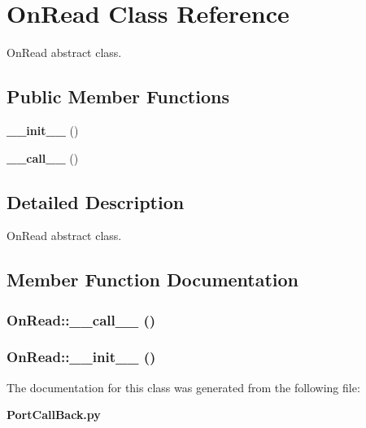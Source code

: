 \section{On\-Read Class Reference}
\label{classOnRead}
On\-Read abstract class.  


\subsection*{Public Member Functions}
\begin{CompactItemize}
\item 
{\bf \_\-\_\-init\_\-\_\-} ()
\item 
{\bf \_\-\_\-call\_\-\_\-} ()
\end{CompactItemize}


\subsection{Detailed Description}
On\-Read abstract class. 



\subsection{Member Function Documentation}
\subsubsection{\setlength{\rightskip}{0pt plus 5cm}On\-Read::\_\-\_\-call\_\-\_\- ()}\label{classOnRead_OnReada1}


\subsubsection{\setlength{\rightskip}{0pt plus 5cm}On\-Read::\_\-\_\-init\_\-\_\- ()}\label{classOnRead_OnReada0}




The documentation for this class was generated from the following file:\begin{CompactItemize}
\item 
{\bf Port\-Call\-Back.py}\end{CompactItemize}
